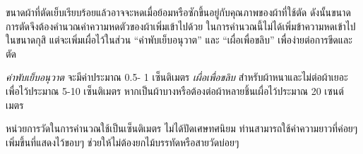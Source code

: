 ขนาดผ้าที่ตัดเย็บเรียบร้อยแล้วอาจจะหดเมื่อย้อมหรือซักขึ้นอยู่กับคุณภาพของผ้าที่ใช้ตัด
ดังนั้นขนาดการตัดจึงต้องคำนวณค่าความหดตัวของผ้าเพิ่มเข้าไปด้วย
ในการคำนวณนี้ไม่ได้เพิ่มข้าความหดเข้าไปในขนาดกุสิ
แต่จะเพิ่มเผื่อไว้ในส่วน ``ค่าพับเย็บอนุวาต'' และ ``เผื่อเพื่อขลิบ''
เพื่อง่ายต่อการขีดและตัด

\emph{ค่าพับเย็บอนุวาต} จะมีค่าประมาณ 0.5- 1 เซ็นติเมตร
\emph{เผื่อเพื่อขลิบ} สำหรับผ้าหนาและไม่ต่อผ้าเยอะ เพื่อไว้ประมาณ 5-10
เซ็นติเมตร หากเป็นผ้าบางหรือต้องต่อผ้าหลายชิ้นเผื่อไว้ประมาณ 20
เซนต์เมตร

หน่วยการวัดในการคำนวณใช้เป็นเซ็นติเมตร ไม่ได้ปัดเศษทศนิยม
ท่านสามารถใช้ค่าความยาวที่ค่อยๆ เพิ่มขึ้นที่แสดงไว้ขอบๆ
ช่วยให้ไม่ต้องยกไม้บรรทัดหรือสายวัดบ่อยๆ

